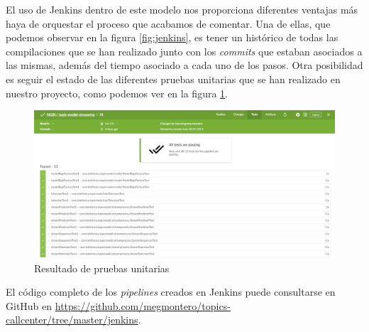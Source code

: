  


El uso de Jenkins dentro de este modelo nos proporciona diferentes ventajas más haya de orquestar el proceso que acabamos de comentar. Una de ellas, que podemos observar en la figura \ref{fig:jenkins}, es tener un histórico de todas las compilaciones que se han realizado junto con los \textit{commits} que estaban asociados a las mismas, además del tiempo asociado a cada uno de los pasos.  Otra posibilidad es seguir el estado de las diferentes pruebas unitarias que se han realizado en nuestro proyecto, como podemos ver en la figura \ref{fig:jenkins-tests}.



\begin{figure}[!ht]
	\centering
	\includegraphics[width=1\textwidth]{images/mant/tests_v2}
	\caption{Resultado de pruebas unitarias}
	\label{fig:jenkins-tests}
\end{figure}

El código completo de los \textit{pipelines} creados en Jenkins puede consultarse en GitHub en \href{https://github.com/megmontero/topics-callcenter/tree/master/jenkins}{https://github.com/megmontero/topics-callcenter/tree/master/jenkins}.

